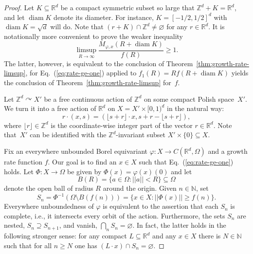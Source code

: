 \documentclass[12pt]{paper}
\numberwithin{equation}{section}
\theoremstyle{plain}
\theoremstyle{definition}
\newcommand{\N}{\mathbb{N}}
\newcommand{\Rd}{\mathbb{R}^{d}}
\newcommand{\Zd}{\mathbb{Z}^{d}}
\DeclareMathOperator*{\diam}{\mathrm{diam}}
\newcommand{\acts}{\curvearrowright}
\newcommand{\norm}[1]{||#1||}
\renewcommand{\phi}{\varphi}
\begin{document}
\begin{proof}
  Let \(K \subseteq \Rd\) be a compact symmetric subset so large that \(\Zd + K = \Rd\), and let
  \(\diam K\) denote its diameter.  For instance, \( K = [-1/2,1/2]^{d}\) with
  \(\diam K = \sqrt{d}\) will do.  Note that \((r + K) \cap \Zd \ne \varnothing\) for any
  \(r \in \Rd\).  It is notationally more convenient to prove the weaker inequality
  \begin{equation}
    \label{eq:rate-ge-one}
    \limsup_{R \to \infty}\dfrac{M_{\phi, x}(R+ \diam K)}{f(R)} \ge 1.
  \end{equation}
  The latter, however, is equivalent to the conclusion of Theorem~\ref{thm:growth-rate-limsup}, for
  Eq.~(\ref{eq:rate-ge-one}) applied to \(f_1(R) = R f(R+ \diam K)\) yields the conclusion of
  Theorem~\ref{thm:growth-rate-limsup} for~\(f\).


  Let \(\Zd \acts X'\) be a free continuous action of \(\Zd\) on some compact Polish space~\(X'\).
  We turn it into a free action of \(\Rd\) on \(X = X' \times [0,1)^{d}\) in the natural way:
  \[r \cdot (x,s) = (\lfloor s+r \rfloor \cdot x, s + r - \lfloor s+r \rfloor),\]
  where \(\lfloor r \rfloor \in \Zd\) is the coordinate-wise integer part of the vector
  \(r \in \Rd\).  Note that~\(X'\) can be identified with the \(\Zd\)-invariant subset
  \(X' \times \{0\} \subseteq X\).

  Fix an everywhere unbounded Borel equivariant \(\phi : X \to C(\Rd, \Omega)\) and a growth rate
  function \(f\). Our goal is to find an \(x \in X\) such that Eq.~(\ref{eq:rate-ge-one}) holds. Let
  \(\Phi : X \to \Omega\) be given by \(\Phi(x) = \phi(x)(0)\) and let
  \[B(R) = \{a \in \Omega : \norm{a} < R\} \subseteq \Omega \]
  denote the open ball of radius \(R\) around the origin. Given \(n \in \N\), set
  \[S_{n} = \Phi^{-1}(\Omega \setminus B(f(n))) = \{ x \in X : \norm{\Phi(x)} \ge f(n)\}. \]
  Everywhere unboundedness of \(\phi\) is equivalent to the assertion that each \(S_{n}\) is
  complete, i.e., it intersects every orbit of the action.  Furthermore, the sets \(S_{n}\) are
  nested, \(S_{n} \supseteq S_{n+1}\), and vanish, \(\bigcap_{n} S_{n} = \varnothing\).  In fact,
  the latter holds in the following stronger sense: for any compact \(L \subseteq \Rd\) and any
  \(x \in X\) there is \(N \in \N\) such that for all \(n \ge N\) one has
  \((L \cdot x) \cap S_{n} = \varnothing\).


\end{proof}
\end{document}

